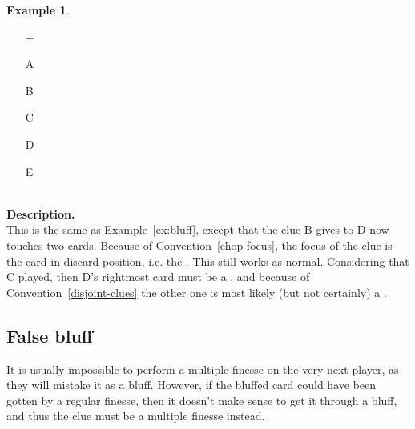 \documentclass[a4paper]{article}
\theoremstyle{plain}
\theoremstyle{definition}
\newtheorem{example}[theorem]{Example}
\begin{document}
\begin{example}	\hfill \\
	\begin{minipage}{0.45\textwidth}
		\begin{itemize}
			\item[\Large +]      
			\item[\Large A]    
			\item[\Large B]    
			\item[\Large C]    
			\item[\Large D]    
			\item[\Large E]    
		\end{itemize}
	\end{minipage}%
	\begin{minipage}{0.55\textwidth}
		\hfill \\
		
		\textbf{Description.} \\
		
		This is the same as Example~\ref{ex:bluff}, except that the  clue B gives to D now touches two cards. Because of Convention~\ref{chop-focus}, the focus of the clue is the card in discard position, i.e. the . This still works as normal. Considering that C played, then D's rightmost card must be a , and because of Convention~\ref{disjoint-clues} the other one is most likely (but not certainly) a .
	\end{minipage}
\end{example} \vspace{0.15 cm}

\subsection{False bluff}

It is usually impossible to perform a multiple finesse on the very next player, as they will mistake it as a bluff. However, if the bluffed card could have been gotten by a regular finesse, then it doesn't make sense to get it through a bluff, and thus the clue must be a multiple finesse instead.
\end{document}
